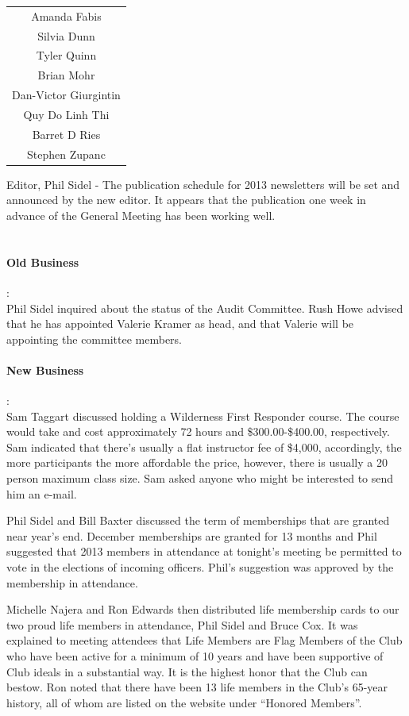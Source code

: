 \documentclass[10pt,a4paper]{article}
\begin{document}
\begin{multicols}{2}
\begin{center}
	\begin{tabular}{c}
		Amanda Fabis \\
		Silvia Dunn \\
		Tyler Quinn \\
		Brian Mohr \\
		Dan-Victor Giurgintin \\
		Quy Do Linh Thi \\
		Barret D Ries \\
		Stephen Zupanc \\
	\end{tabular}
\end{center}

Editor, Phil Sidel - The publication schedule for 2013 newsletters will be set and announced by the new editor.  It appears that the publication one week in advance of the General Meeting has been working well.
\\
\\
\paragraph{Old Business} :
\\
Phil Sidel inquired about the status of the Audit Committee.  Rush Howe advised that he has appointed Valerie Kramer as head, and that Valerie will be appointing the committee members.
\\
\paragraph{New Business} :
\\
Sam Taggart discussed holding a Wilderness First Responder course. The course would take and cost approximately 72 hours and \$300.00-\$400.00, respectively. Sam indicated that there's usually a flat instructor fee of \$4,000, accordingly, the more participants the more affordable the price, however, there is usually a 20 person maximum class size.  Sam asked anyone who might be interested to send him an e-mail.

Phil Sidel and Bill Baxter discussed the term of memberships that are granted near year's end. December memberships are granted for 13 months and Phil suggested that 2013 members in attendance at tonight's meeting be permitted to vote in the elections of incoming officers.  Phil's suggestion was approved by the membership in attendance.

Michelle Najera and Ron Edwards then distributed life membership cards to our two proud life members in attendance, Phil Sidel and Bruce Cox.  It was explained to meeting attendees that Life Members are Flag Members of the Club who have been active for a minimum of 10 years and have been supportive of Club ideals in a substantial way.  It is the highest honor that the Club can bestow.  Ron noted that there have been 13 life members in the Club's 65-year history, all of whom are listed on the website under “Honored Members”.


\end{multicols}
\end{document}
